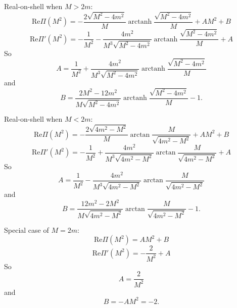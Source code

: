 \documentclass[10pt]{article}
\theoremstyle{definition}
\theoremstyle{remark}
\DeclareMathOperator{\arctanh}{arctanh}
\begin{document}
	Real-on-shell when $M>2m$:
	\[\mathrm{Re}\Pi(M^{2})=-\frac{2\sqrt{M^{2}-4m^{2}}}{M}\arctanh\frac{\sqrt{M^{2}-4m^{2}}}{M}+AM^{2}+B\]
	\[\mathrm{Re}\Pi'(M^{2})=-\frac{1}{M^{2}}-\frac{4m^{2}}{M^{3}\sqrt{M^{2}-4m^{2}}}\arctanh\frac{\sqrt{M^{2}-4m^{2}}}{M}+A\]
	So
	\[A=\frac{1}{M^{2}}+\frac{4m^{2}}{M^{3}\sqrt{M^{2}-4m^{2}}}\arctanh\frac{\sqrt{M^{2}-4m^{2}}}{M}\]
	and
	\[B=\frac{2M^{2}-12m^{2}}{M\sqrt{M^{2}-4m^{2}}}\arctanh\frac{\sqrt{M^{2}-4m^{2}}}{M}-1.\]
	
	Real-on-shell when $M<2m$:
	\[\mathrm{Re}\Pi(M^{2})=-\frac{2\sqrt{4m^{2}-M^{2}}}{M}\arctan\frac{M}{\sqrt{4m^{2}-M^{2}}}+AM^{2}+B\]
	\[\mathrm{Re}\Pi'(M^{2})=-\frac{1}{M^{2}}+\frac{4m^{2}}{M^{3}\sqrt{4m^{2}-M^{2}}}\arctan\frac{M}{\sqrt{4m^{2}-M^{2}}}+A\]
	So
	\[A=\frac{1}{M^{2}}-\frac{4m^{2}}{M^{3}\sqrt{4m^{2}-M^{2}}}\arctan\frac{M}{\sqrt{4m^{2}-M^{2}}}\]
	and
	\[B=\frac{12m^{2}-2M^{2}}{M\sqrt{4m^{2}-M^{2}}}\arctan\frac{M}{\sqrt{4m^{2}-M^{2}}}-1.\]
	
	Special case of $M=2m$:
	\[\mathrm{Re}\Pi(M^{2})=AM^{2}+B\]
	\[\mathrm{Re}\Pi'(M^{2})=-\frac{2}{M^{2}}+A\]
	So
	\[A=\frac{2}{M^{2}}\]
	and
	\[B=-AM^{2}=-2.\]
	
	
	
\end{document}
